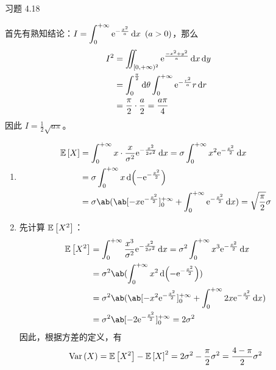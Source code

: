 \begin{problem}
    习题 4.18
    \begin{solution}
        首先有熟知结论：$\displaystyle I = \int_{0}^{+ \infty} \mathrm{e}^{-\frac{x^2}{a}} \dd{x}\ (a > 0)$，那么
        $$
        \begin{aligned}
            I^2 & = \iint_{[0, + \infty)^2} \mathrm{e}^{\frac{-{x^2 + y^2}}{a}} \dd{x} \dd{y} \\
            & = \int_{0}^{\frac{\pi}{2}} \dd{\theta} \int_{0}^{+\infty} \mathrm{e}^{-\frac{r^2}{a}} r \dd{r} \\
            & = \frac{\pi}{2} \cdot \frac{a}{2} = \frac{a \pi}{4}
        \end{aligned}
        $$
        因此 $I = \frac{1}{2} \sqrt{a \pi}$。

        \begin{enumerate}
            \item[\textbf{1)}]
            $$
            \begin{aligned}
                \expect{X} & = \int_{0}^{+ \infty} x \cdot \frac{x}{\sigma^2} \E^{-\frac{x^2}{2 \sigma^2}} \dd{x} = \sigma \int_{0}^{+ \infty} x^2 \E^{-\frac{x^2}{2}} \dd{x} \\
                & = \sigma \int_{0}^{+ \infty} x \dd(-\E^{-\frac{x^2}{2}}) \\
                & = \sigma \ab(\ab[- x \E^{-\frac{x^2}{2}}]_{0}^{+ \infty} + \int_{0}^{+ \infty} \E^{-\frac{x^2}{2}} \dd{x}) = \sqrt{\frac{\pi}{2}} \sigma
            \end{aligned}
            $$
            \item[\textbf{2)}] 先计算 $\operatorname{\mathbb{E}}\left[X^2\right]$：
            $$
            \begin{aligned}
                \expect{X^2} & = \int_{0}^{+ \infty} \frac{x^3}{\sigma^2} \E^{-\frac{x^2}{2 \sigma^2}} \dd{x} = \sigma^2 \int_{0}^{+ \infty} x^3 \E^{-\frac{x^2}{2}} \dd{x} \\
                & = \sigma^2 \ab(\int_{0}^{+ \infty} x^2 \dd(-\E^{-\frac{x^2}{2}})) \\
                & = \sigma^2 \ab(\ab[-x^2 \E^{-\frac{x^2}{2}}]_{0}^{+ \infty} + \int_{0}^{+ \infty} 2 x \E^{-\frac{x^2}{2}} \dd{x}) \\
                & = \sigma^2 \ab[-2 \E^{-\frac{x^2}{2}}]_{0}^{+ \infty} = 2 \sigma^2
            \end{aligned}
            $$
            因此，根据方差的定义，有
            $$
            \operatorname{Var}\left(X\right) = \operatorname{\mathbb{E}}\left[X^2\right] - \operatorname{\mathbb{E}}\left[X\right]^2 = 2 \sigma^2 - \frac{\pi}{2} \sigma^2 = \frac{4 - \pi}{2} \sigma^2
            $$
        \end{enumerate}
    \end{solution}
\end{problem}

